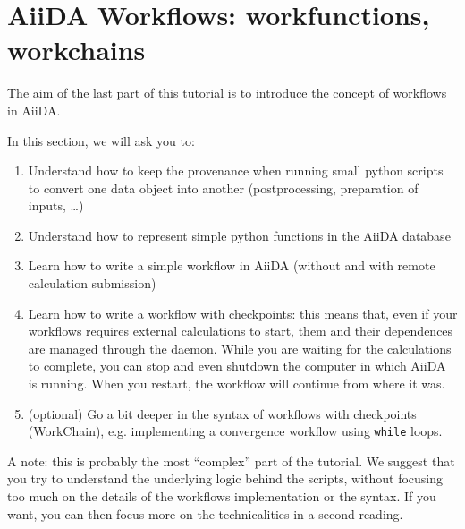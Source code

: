 
\section{AiiDA Workflows: workfunctions, workchains}

The aim of the last part of this tutorial is to introduce the concept of workflows in AiiDA. 

In this section, we will ask you to:
\begin{enumerate}
\item Understand how to keep the provenance when running small python scripts to convert one data object into another (postprocessing, preparation of inputs, \ldots)
\item Understand how to represent simple python functions in the AiiDA database
\item Learn how to write a simple workflow in AiiDA (without and with remote calculation submission)
\item Learn how to write a workflow with checkpoints: this means that, even if your
workflows requires external calculations to start, them and their dependences are managed through the daemon. While you are waiting for the calculations to complete, you can stop and even shutdown the computer in which AiiDA is running. When you restart, the workflow will
continue from where it was.
\item (optional) Go a bit deeper in the syntax of workflows with checkpoints (WorkChain), e.g. implementing a convergence workflow using \texttt{while} loops.
\end{enumerate}

A note: this is probably the most ``complex'' part of the tutorial.
We suggest that you try to understand the underlying logic behind the scripts,
without focusing too much on the details of the workflows implementation or the syntax.
If you want, you can then focus more on the technicalities in a second reading.

